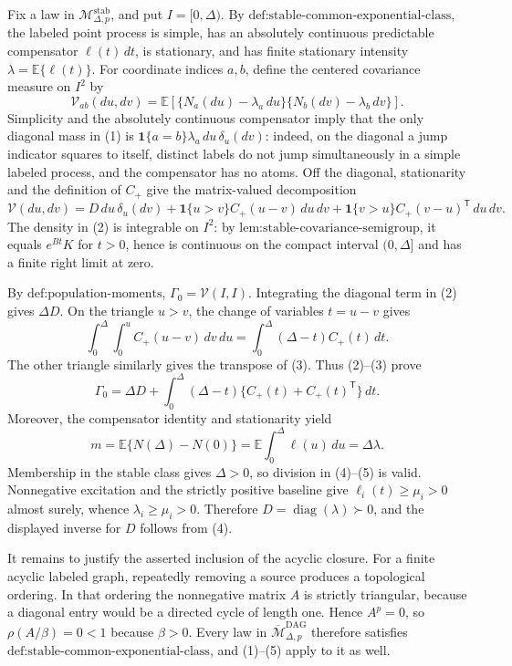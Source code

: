 Fix a law in \(\mathcal M_{\Delta,p}^{\mathrm{stab}}\), and put \(I=[0,\Delta)\).  By \(\text{def:stable-common-exponential-class}\), the labeled point process is simple, has an absolutely continuous predictable compensator \(\ell(t)\,dt\), is stationary, and has finite stationary intensity \(\lambda=\mathbb E\{\ell(t)\}\).  For coordinate indices \(a,b\), define the centered covariance measure on \(I^2\) by
\[
 \mathcal V_{ab}(du,dv)
 =\mathbb E\!\left[
   \{N_a(du)-\lambda_a\,du\}
   \{N_b(dv)-\lambda_b\,dv\}
 \right].
\tag{1}
\]
Simplicity and the absolutely continuous compensator imply that the only diagonal mass in (1) is
\(\mathbf 1\{a=b\}\lambda_a\,du\,\delta_u(dv)\): indeed, on the diagonal a jump indicator squares to itself, distinct labels do not jump simultaneously in a simple labeled process, and the compensator has no atoms.  Off the diagonal, stationarity and the definition of \(C_{+}\) give the matrix-valued decomposition
\[
 \mathcal V(du,dv)
 =D\,du\,\delta_u(dv)
  +\mathbf 1\{u>v\}C_{+}(u-v)\,du\,dv
  +\mathbf 1\{v>u\}C_{+}(v-u)^{\mathsf T}\,du\,dv.
\tag{2}
\]
The density in (2) is integrable on \(I^2\): by \(\text{lem:stable-covariance-semigroup}\), it equals \(e^{Bt}K\) for \(t>0\), hence is continuous on the compact interval \((0,\Delta]\) and has a finite right limit at zero.

By \(\text{def:population-moments}\), \(\Gamma_0=\mathcal V(I,I)\).  Integrating the diagonal term in (2) gives \(\Delta D\).  On the triangle \(u>v\), the change of variables \(t=u-v\) gives
\[
 \int_0^\Delta\!\int_0^u C_{+}(u-v)\,dv\,du
 =\int_0^\Delta(\Delta-t)C_{+}(t)\,dt.
\tag{3}
\]
The other triangle similarly gives the transpose of (3).  Thus (2)--(3) prove
\[
 \Gamma_0=\Delta D+\int_0^\Delta(\Delta-t)
 \{C_{+}(t)+C_{+}(t)^{\mathsf T}\}\,dt.
\tag{4}
\]
Moreover, the compensator identity and stationarity yield
\[
 m=\mathbb E\{N(\Delta)-N(0)\}
   =\mathbb E\!\int_0^\Delta\ell(u)\,du
   =\Delta\lambda.
\tag{5}
\]
Membership in the stable class gives \(\Delta>0\), so division in (4)--(5) is valid.  Nonnegative excitation and the strictly positive baseline give \(\ell_i(t)\geq\mu_i>0\) almost surely, whence \(\lambda_i\geq\mu_i>0\).  Therefore \(D=\operatorname{diag}(\lambda)\succ0\), and the displayed inverse for \(D\) follows from (4).

It remains to justify the asserted inclusion of the acyclic closure.  For a finite acyclic labeled graph, repeatedly removing a source produces a topological ordering.  In that ordering the nonnegative matrix \(A\) is strictly triangular, because a diagonal entry would be a directed cycle of length one.  Hence \(A^p=0\), so \(\rho(A/\beta)=0<1\) because \(\beta>0\).  Every law in \(\overline{\mathcal M}_{\Delta,p}^{\mathrm{DAG}}\) therefore satisfies \(\text{def:stable-common-exponential-class}\), and (1)--(5) apply to it as well.